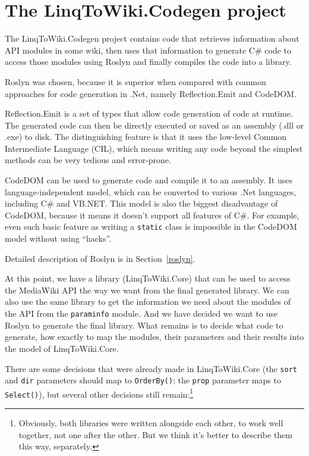 \section{The LinqToWiki.Codegen project}
\label{ltwc}

The LinqToWiki.Codegen project contains code that retrieves information about API modules in some wiki,
then uses that information to generate C\# code to access those modules using Roslyn
and finally compiles the code into a library.

\medskip

Roslyn was chosen, because it is superior when compared with common approaches for code generation in .Net,
namely Reflection.Emit and CodeDOM.

Reflection.Emit \cite{reflection-emit} is a set of types that allow code generation of code at runtime.
The generated code can then be directly executed or saved as an assembly (.dll or .exe) to disk.
The distinguishing feature is that it uses the low-level Common Intermediate Language (CIL),
which means writing any code beyond the simplest methods can be very tedious and error-prone.

CodeDOM \cite{codedom} can be used to generate code and compile it to an assembly.
It uses language-independent model, which can be converted to various .Net languages,
including C\# and VB.NET.
This model is also the biggest disadvantage of CodeDOM, because it means it doesn't support all features of C\#.
For example, even such basic feature as writing a \lstinline{static} class is impossible in the CodeDOM model
without using “hacks”.

Detailed description of Roslyn is in Section~\ref{roslyn}.

\medskip

At this point, we have a library (LinqToWiki.Core) that can be used to access the MediaWiki API the way we want
from the final generated library.
We can also use the same library to get the information we need about the modules of the API from the \texttt{paraminfo} module.
And we have decided we want to use Roslyn to generate the final library.
What remains is to decide what code to generate, how exactly to map the modules, their parameters
and their results into the model of LinqToWiki.Core.


There are some decisions that were already made in LinqToWiki.Core
(the \texttt{sort} and \texttt{dir} parameters should map to \lstinline{OrderBy()};
the \texttt{prop} parameter maps to \lstinline{Select()}),
but several other decisions still remain:\footnote{
Obviously, both libraries were written alongside each other, to work well together, not one after the other.
But we think it's better to describe them this way, separately.}

